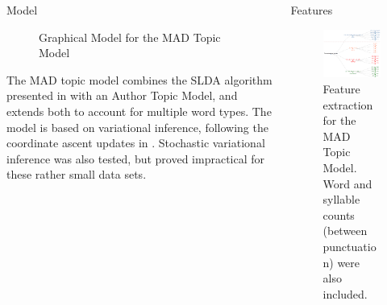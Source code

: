 \documentclass[final]{beamer}
\newlength{\onecolwid}
\newlength{\twocolwid}
\begin{document}
\begin{frame}[t]
\begin{columns}[t]
\begin{column}{\twocolwid}
\begin{columns}[t,totalwidth=\twocolwid]
\begin{column}{\onecolwid}
\begin{block}{Model}
\begin{figure}[h!]
\begin{tikzpicture}
  \end{tikzpicture}
  \caption{Graphical Model for the MAD Topic Model}
\end{figure}
\small The MAD topic model combines the SLDA algorithm presented in \cite{wang2009simultaneous} with an Author Topic Model, and extends both to account for multiple word types. The model is based on variational inference, following the coordinate ascent updates in \cite{wang2009simultaneous}. Stochastic variational inference was also tested, but proved impractical for these rather small data sets. 

\end{block}


\end{column} %

\begin{column}{\onecolwid}\vspace{-.6in} %


\begin{block}{Features}

\begin{figure}
\centering
\includegraphics[width=\linewidth]{dendrogram.png}
\caption{Feature extraction for the MAD Topic Model. Word and syllable counts (between punctuation) were also included.}
\end{figure}


\end{block}
\end{column}
\end{columns}
\end{column}
\end{columns}
\end{frame}
\end{document}
